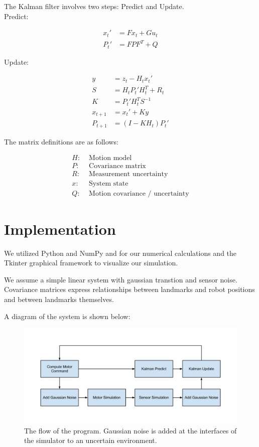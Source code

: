 \documentclass[prodmode,acmtecs]{acmsmall} %
\begin{document}
The Kalman filter involves two steps: Predict and Update. \\

Predict:

\begin{align*}
    x_t' &= F x_t + G u_t \\
    P_t' &= F P F^T + Q
\end{align*}

Update:

\begin{align*}
    y &= z_t - H_t x_t' \\
    S &= H_t P_t' H^T_t + R_t \\
    K &= P_t' H^T_t S^{-1} \\
    x_{t+1} &= x_t' + Ky \\
    P_{t+1} &= (I - K H_t) P_t'
\end{align*}

The matrix definitions are as follows:

\begin{align*}
    H:& \text{ Motion model}\\
    P:& \text{ Covariance matrix}\\
    R:& \text{ Measurement uncertainty}\\
    x:& \text{ System state}\\
    Q:& \text{ Motion covariance / uncertainty}
\end{align*}

\section{Implementation}

We utilized Python and NumPy and for our numerical calculations and the Tkinter graphical framework to visualize our simulation.

We assume a simple linear system with gaussian transtion and sensor noise.  Covariance matrices express relationships between landmarks and robot positions and between landmarks themselves.  

A diagram of the system is shown below:

\begin{figure}[h!]
\includegraphics[width=\textwidth]{systemdiagram.png}
\caption{The flow of the program. Gaussian noise is added at the interfaces of the simulator to an uncertain environment.}
\end{figure}
\end{document}
